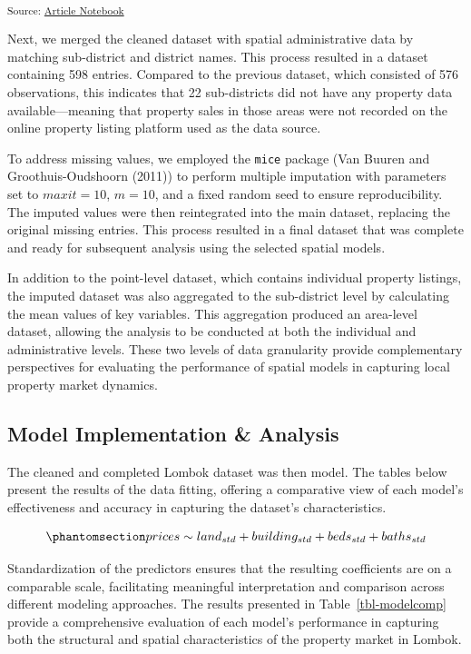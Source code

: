 \documentclass[
  default,
]{sn-jnl}
\begin{document}
\endgroup{}

\textsubscript{Source:
\href{https://indiraputeri-phd.github.io/CAR_simcomp/manuscript.qmd.html}{Article
Notebook}}

Next, we merged the cleaned dataset with spatial administrative data by
matching sub-district and district names. This process resulted in a
dataset containing 598 entries. Compared to the previous dataset, which
consisted of 576 observations, this indicates that 22 sub-districts did
not have any property data available---meaning that property sales in
those areas were not recorded on the online property listing platform
used as the data source.

To address missing values, we employed the \texttt{mice} package (Van
Buuren and Groothuis-Oudshoorn (2011)) to perform multiple imputation
with parameters set to \(maxit = 10\), \(m = 10\), and a fixed random
seed to ensure reproducibility. The imputed values were then
reintegrated into the main dataset, replacing the original missing
entries. This process resulted in a final dataset that was complete and
ready for subsequent analysis using the selected spatial models.

In addition to the point-level dataset, which contains individual
property listings, the imputed dataset was also aggregated to the
sub-district level by calculating the mean values of key variables. This
aggregation produced an area-level dataset, allowing the analysis to be
conducted at both the individual and administrative levels. These two
levels of data granularity provide complementary perspectives for
evaluating the performance of spatial models in capturing local property
market dynamics.

\subsection{Model Implementation \&
Analysis}\label{model-implementation-analysis}

The cleaned and completed Lombok dataset was then model. The tables
below present the results of the data fitting, offering a comparative
view of each model's effectiveness and accuracy in capturing the
dataset's characteristics.

\begin{equation}\phantomsection\label{eq-lopreg}{
prices \sim land_{std} + building_{std} + beds_{std} + baths_{std}
}\end{equation}

Standardization of the predictors ensures that the resulting
coefficients are on a comparable scale, facilitating meaningful
interpretation and comparison across different modeling approaches. The
results presented in Table~\ref{tbl-modelcomp} provide a comprehensive
evaluation of each model's performance in capturing both the structural
and spatial characteristics of the property market in Lombok.
\end{document}
